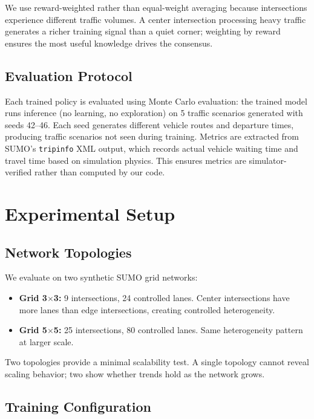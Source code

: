 \documentclass[conference]{IEEEtran}
\begin{document}
We use reward-weighted rather than equal-weight averaging because intersections experience different traffic volumes. A center intersection processing heavy traffic generates a richer training signal than a quiet corner; weighting by reward ensures the most useful knowledge drives the consensus.

\subsection{Evaluation Protocol}

Each trained policy is evaluated using Monte Carlo evaluation: the trained model runs inference (no learning, no exploration) on 5 traffic scenarios generated with seeds 42--46. Each seed generates different vehicle routes and departure times, producing traffic scenarios not seen during training. Metrics are extracted from SUMO's \texttt{tripinfo} XML output, which records actual vehicle waiting time and travel time based on simulation physics. This ensures metrics are simulator-verified rather than computed by our code.

\section{Experimental Setup}

\subsection{Network Topologies}

We evaluate on two synthetic SUMO grid networks:
\begin{itemize}
    \item \textbf{Grid 3$\times$3:} 9 intersections, 24 controlled lanes. Center intersections have more lanes than edge intersections, creating controlled heterogeneity.
    \item \textbf{Grid 5$\times$5:} 25 intersections, 80 controlled lanes. Same heterogeneity pattern at larger scale.
\end{itemize}

Two topologies provide a minimal scalability test. A single topology cannot reveal scaling behavior; two show whether trends hold as the network grows.

\subsection{Training Configuration}
\end{document}
